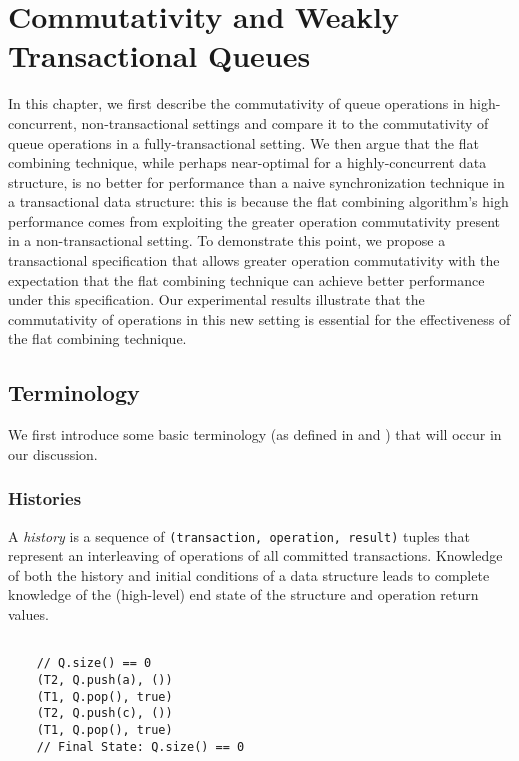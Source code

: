 \chapter{Commutativity and Weakly Transactional Queues}
\label{commutativity}

In this chapter, we first describe the commutativity of queue operations in high-concurrent, non-transactional settings and compare it to the commutativity of queue operations in a fully-transactional setting. We then argue that the flat combining technique, while perhaps near-optimal for a highly-concurrent data structure, is no better for performance than a naive synchronization technique in a transactional data structure: this is because the flat combining algorithm's high performance comes from exploiting the greater operation commutativity present in a non-transactional setting. To demonstrate this point, we propose a transactional specification that allows greater operation commutativity with the expectation that the flat combining technique can achieve better performance under this specification. Our experimental results illustrate that the commutativity of operations in this new setting is essential for the effectiveness of the flat combining technique.

\section{Terminology}
We first introduce some basic terminology (as defined in \cite{schwarz} and \cite{weihl}) that will occur in our discussion.

\subsection{Histories}
\begin{defn}
    A \emph{history} is a sequence of \texttt{(transaction, operation, result)} tuples that represent an interleaving of operations of all committed transactions. Knowledge of both the history and initial conditions of a data structure leads to complete knowledge of the (high-level) end state of the structure and operation return values.

\begin{eg}
    \begin{lstlisting}
   
    // Q.size() == 0 
    (T2, Q.push(a), ())
    (T1, Q.pop(), true)
    (T2, Q.push(c), ())
    (T1, Q.pop(), true)
    // Final State: Q.size() == 0 
    \end{lstlisting}
\end{eg}

\end{defn}


